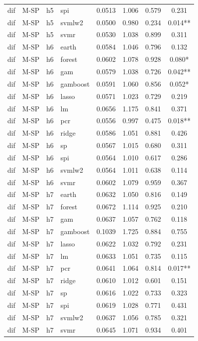 \begin{ThreePartTable}
\begin{longtable}[t]{llclcccc}
dif & M-SP & h5 & spi & 0.0513 & 1.006 & 0.579 & 0.231\\
dif & M-SP & h5 & svmlw2 & 0.0500 & 0.980 & 0.234 & 0.014**\\
dif & M-SP & h5 & svmr & 0.0530 & 1.038 & 0.899 & 0.311\\
\addlinespace
dif & M-SP & h6 & earth & 0.0584 & 1.046 & 0.796 & 0.132\\
dif & M-SP & h6 & forest & 0.0602 & 1.078 & 0.928 & 0.080*\\
dif & M-SP & h6 & gam & 0.0579 & 1.038 & 0.726 & 0.042**\\
dif & M-SP & h6 & gamboost & 0.0591 & 1.060 & 0.856 & 0.052*\\
dif & M-SP & h6 & lasso & 0.0571 & 1.023 & 0.729 & 0.219\\
dif & M-SP & h6 & lm & 0.0656 & 1.175 & 0.841 & 0.371\\
dif & M-SP & h6 & pcr & 0.0556 & 0.997 & 0.475 & 0.018**\\
dif & M-SP & h6 & ridge & 0.0586 & 1.051 & 0.881 & 0.426\\
dif & M-SP & h6 & sp & 0.0567 & 1.015 & 0.680 & 0.311\\
dif & M-SP & h6 & spi & 0.0564 & 1.010 & 0.617 & 0.286\\
dif & M-SP & h6 & svmlw2 & 0.0564 & 1.011 & 0.638 & 0.114\\
dif & M-SP & h6 & svmr & 0.0602 & 1.079 & 0.959 & 0.367\\
\addlinespace
dif & M-SP & h7 & earth & 0.0632 & 1.050 & 0.816 & 0.149\\
dif & M-SP & h7 & forest & 0.0672 & 1.114 & 0.925 & 0.210\\
dif & M-SP & h7 & gam & 0.0637 & 1.057 & 0.762 & 0.118\\
dif & M-SP & h7 & gamboost & 0.1039 & 1.725 & 0.884 & 0.755\\
dif & M-SP & h7 & lasso & 0.0622 & 1.032 & 0.792 & 0.231\\
dif & M-SP & h7 & lm & 0.0633 & 1.051 & 0.735 & 0.115\\
dif & M-SP & h7 & pcr & 0.0641 & 1.064 & 0.814 & 0.017**\\
dif & M-SP & h7 & ridge & 0.0610 & 1.012 & 0.601 & 0.151\\
dif & M-SP & h7 & sp & 0.0616 & 1.022 & 0.733 & 0.323\\
dif & M-SP & h7 & spi & 0.0619 & 1.028 & 0.771 & 0.431\\
dif & M-SP & h7 & svmlw2 & 0.0637 & 1.056 & 0.785 & 0.321\\
dif & M-SP & h7 & svmr & 0.0645 & 1.071 & 0.934 & 0.401\\

\end{longtable}
\end{ThreePartTable}

